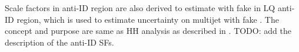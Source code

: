 Scale factors in anti-ID region are also derived to estimate \ttbar with fake \tauhad in LQ \hadhad anti-ID region,
which is used to estimate uncertainty on multijet with fake \tauhad. The concept and purpose are same as HH analysis as 
described in . %
{\color{red} TODO:  add the description of the anti-ID SFs}.


